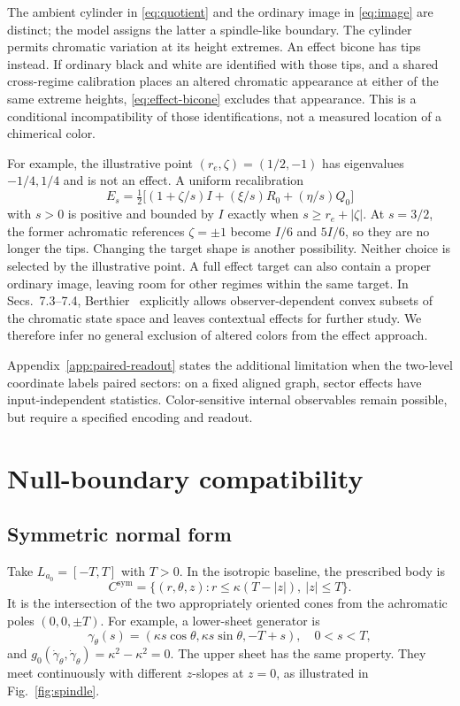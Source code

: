 \documentclass[9pt,twocolumn,twoside]{opticajnl}
\theoremstyle{plain}
\begin{document}
The ambient cylinder in \eqref{eq:quotient} and the ordinary image in \eqref{eq:image} are distinct; the model assigns the latter a spindle-like boundary. The cylinder permits chromatic variation at its height extremes. An effect bicone has tips instead. If ordinary black and white are identified with those tips, and a shared cross-regime calibration places an altered chromatic appearance at either of the same extreme heights, \eqref{eq:effect-bicone} excludes that appearance. This is a conditional incompatibility of those identifications, not a measured location of a chimerical color.

For example, the illustrative point $(r_e,\zeta)=(1/2,-1)$ has eigenvalues $-1/4,1/4$ and is not an effect. A uniform recalibration
\begin{equation}
 E_s=\tfrac12\bigl[(1+\zeta/s)I+(\xi/s)R_0+(\eta/s)Q_0\bigr]
 \label{eq:effect-recalibration}
\end{equation}
with $s>0$ is positive and bounded by $I$ exactly when $s\geq r_e+|\zeta|$. At $s=3/2$, the former achromatic references $\zeta=\pm1$ become $I/6$ and $5I/6$, so they are no longer the tips. Changing the target shape is another possibility. Neither choice is selected by the illustrative point. A full effect target can also contain a proper ordinary image, leaving room for other regimes within the same target. In Secs.~7.3--7.4, Berthier~\cite{Berthier2020} explicitly allows observer-dependent convex subsets of the chromatic state space and leaves contextual effects for further study. We therefore infer no general exclusion of altered colors from the effect approach.

Appendix~\ref{app:paired-readout} states the additional limitation when the two-level coordinate labels paired sectors: on a fixed aligned graph, sector effects have input-independent statistics. Color-sensitive internal observables remain possible, but require a specified encoding and readout.

\section{Null-boundary compatibility}
\label{sec:constraint}
\subsection{Symmetric normal form}
Take $L_{a_0}=[-T,T]$ with $T>0$. In the isotropic baseline, the prescribed body is
\begin{equation}
 C^{\mathrm{sym}}=\{(r,\theta,z):r\leq\kappa(T-|z|),\ |z|\leq T\}.
 \label{eq:bicone}
\end{equation}
It is the intersection of the two appropriately oriented cones from the achromatic poles $(0,0,\pm T)$. For example, a lower-sheet generator is
\begin{equation}
 \gamma_\theta(s)=(\kappa s\cos\theta,\kappa s\sin\theta,-T+s),
 \quad 0<s<T,
 \label{eq:generator}
\end{equation}
and $g_0(\dot\gamma_\theta,\dot\gamma_\theta)=\kappa^2-\kappa^2=0$. The upper sheet has the same property. They meet continuously with different $z$-slopes at $z=0$, as illustrated in Fig.~\ref{fig:spindle}.
\end{document}
